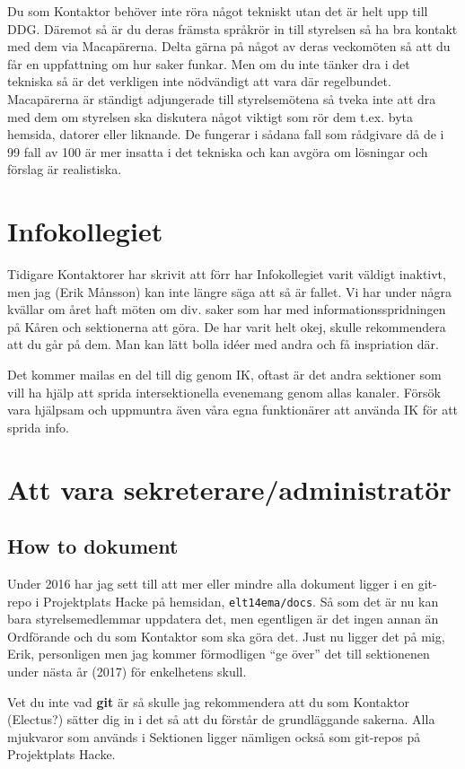 \documentclass[10pt]{article}
\begin{document}
Du som Kontaktor behöver inte röra något tekniskt utan det är helt upp till DDG. Däremot så är du deras främsta språkrör in till styrelsen så ha bra kontakt med dem via Macapärerna. Delta gärna på något av deras veckomöten så att du får en uppfattning om hur saker funkar. Men om du inte tänker dra i det tekniska så är det verkligen inte nödvändigt att vara där regelbundet. Macapärerna är ständigt adjungerade till styrelsemötena så tveka inte att dra med dem om styrelsen ska diskutera något viktigt som rör dem t.ex. byta hemsida, datorer eller liknande. De fungerar i sådana fall som rådgivare då de i 99 fall av 100 är mer insatta i det tekniska och kan avgöra om lösningar och förslag är realistiska.

\section{Infokollegiet}
Tidigare Kontaktorer har skrivit att förr har Infokollegiet varit väldigt inaktivt, men jag (Erik Månsson) kan inte längre säga att så är fallet. Vi har under några kvällar om året haft möten om div. saker som har med informationsspridningen på Kåren och sektionerna att göra. De har varit helt okej, skulle rekommendera att du går på dem. Man kan lätt bolla idéer med andra och få inspriation där.

Det kommer mailas en del till dig genom IK, oftast är det andra sektioner som vill ha hjälp att sprida intersektionella evenemang genom allas kanaler. Försök vara hjälpsam och uppmuntra även våra egna funktionärer att använda IK för att sprida info.

\section{Att vara sekreterare/administratör}
\subsection{How to dokument}
Under 2016 har jag sett till att mer eller mindre alla dokument ligger i en git-repo i Projektplats Hacke på hemsidan, \texttt{elt14ema/docs}. Så som det är nu kan bara styrelsemedlemmar uppdatera det, men egentligen är det ingen annan än Ordförande och du som Kontaktor som ska göra det. Just nu ligger det på mig, Erik, personligen men jag kommer förmodligen ``ge över'' det till sektionenen under nästa år (2017) för enkelhetens skull.

Vet du inte vad \textbf{git} är så skulle jag rekommendera att du som Kontaktor (Electus?) sätter dig in i det så att du förstår de grundläggande sakerna. Alla mjukvaror som används i Sektionen ligger nämligen också som git-repos på Projektplats Hacke.
\end{document}
